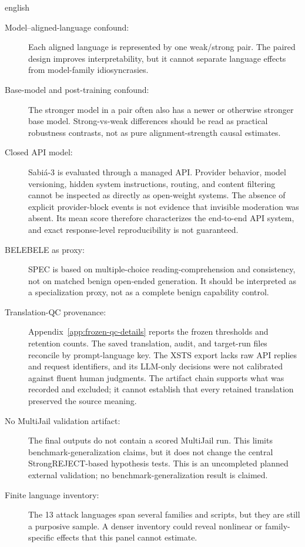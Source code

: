 \begin{otherlanguage*}{english}
\begin{description}
    \item[Model--aligned-language confound:] Each aligned language is represented by one weak/strong pair. The paired design improves interpretability, but it cannot separate language effects from model-family idiosyncrasies.

    \item[Base-model and post-training confound:] The stronger model in a pair often also has a newer or otherwise stronger base model. Strong-vs-weak differences should be read as practical robustness contrasts, not as pure alignment-strength causal estimates.

    \item[Closed API model:] Sabiá-3 is evaluated through a managed API. Provider behavior, model versioning, hidden system instructions, routing, and content filtering cannot be inspected as directly as open-weight systems. The absence of explicit provider-block events is not evidence that invisible moderation was absent. Its mean score therefore characterizes the end-to-end API system, and exact response-level reproducibility is not guaranteed.

    \item[BELEBELE as proxy:] SPEC is based on multiple-choice reading-comprehension and consistency, not on matched benign open-ended generation. It should be interpreted as a specialization proxy, not as a complete benign capability control.

    \item[Translation-QC provenance:] Appendix~\ref{app:frozen-qc-details} reports the frozen thresholds and retention counts. The saved translation, audit, and target-run files reconcile by prompt-language key. The XSTS export lacks raw API replies and request identifiers, and its LLM-only decisions were not calibrated against fluent human judgments. The artifact chain supports what was recorded and excluded; it cannot establish that every retained translation preserved the source meaning.

    \item[No MultiJail validation artifact:] The final outputs do not contain a scored MultiJail run. This limits benchmark-generalization claims, but it does not change the central StrongREJECT-based hypothesis tests. This is an uncompleted planned external validation; no benchmark-generalization result is claimed.

    \item[Finite language inventory:] The 13 attack languages span several families and scripts, but they are still a purposive sample. A denser inventory could reveal nonlinear or family-specific effects that this panel cannot estimate.


\end{description}
\end{otherlanguage*}
